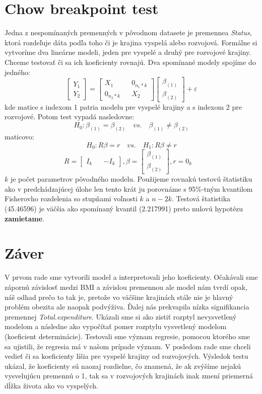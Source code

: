 \section*{Chow breakpoint test}
Jedna z nespomínaných premenných v pôvodnom datasete je premennea \textit{Status}, ktorá rozdeľuje dáta podľa toho či je krajina vyspelá alebo rozvojová.
Formálne si vytvoríme dva lineárne modeli, jeden pre vyspelé a druhý pre rozvojové krajiny. Chceme testovať či sa ich koeficienty rovnajú.
Dva spomínané modely spojíme do jedného:
\[
    \begin{bmatrix}
        Y_1 \\
        Y_2 
    \end{bmatrix}
    =
    \begin{bmatrix}
        X_1 && 0_{n_1*k} \\
        0_{n_2*k} && X_2
    \end{bmatrix}
    \begin{bmatrix}
        \beta_{(1)} \\
        \beta_{(2)}
    \end{bmatrix}
    +
    \varepsilon
\]
kde matice s indexom 1 patria modelu pre vyspelé krajiny a s indexom 2 pre rozvojové.
Potom test vypadá nasledovne:
\[
    H_0: \beta_{(1)} = \beta_{(2)} \quad vs. \quad  \beta_{(1)} \ne \beta_{(2)} 
\]
maticovo:
\[
    H_0: R\beta = r \quad vs. \quad H_1: R\beta \ne r 
\]
\[
    R =  \begin{bmatrix}
        I_k && -I_k
    \end{bmatrix},
    \beta = \begin{bmatrix}
        \beta_{(1)} \\
        \beta_{(2)}
    \end{bmatrix},
    r = 0_k
    \quad
\]
$k$ je počet parametrov pôvodného modelu. Použijeme rovnakú testovú štatistiku ako v predchádzajúcej úlohe len tento krát ju 
porovnáme s 95\%-tným kvantilom Fisherovho rozdelenia so stupňami voľnosti $k$ a $n-2k$. Testová štatistika (45.46596) je väčšia ako spomínaný kvantil (2.217991)
preto nulovú hypotézu \textbf{zamietame}.

\section*{Záver}
V prvom rade sme vytvorili model a interpretovali jeho koeficienty. Očakávali sme zápornú závislosť medzi BMI a závislou premennou ale model
nám tvrdí opak, náš odhad prečo to tak je, pretože vo väčšine krajinách stále nie je hlavný problém obezita ale naopak podvýživa. Ďalej nás prekvapila nízka signifikancia premennej \textit{Total.expenditure}.
Ukázali sme si ako zistiť rozptyl nevysvetlený modelom a následne ako vypočítať pomer rozptylu vysvetlený modelom (koeficient determinácie). Testovali sme význam regresie, pomocou ktorého sme sa ujistili, že regresia má v našom 
prípade význam. V posledom rade sme chceli vedieť či sa koeficienty líšia pre vyspelé krajiny od rozvojových. Výsledok testu ukázal, že koeficienty sú naozaj rozdielne, čo znamená, že
ak zvýšíme nejakú vysvelujúcu premennú o 1, tak sa v rozvojových krajinách inak zmení priemerná dĺžka života ako vo vyspelých.
